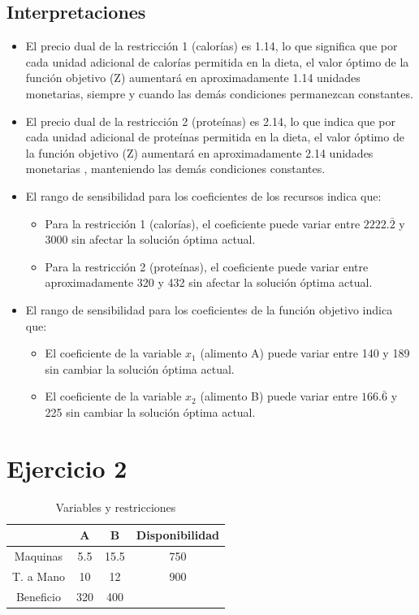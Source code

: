 \documentclass[12pt]{article}
\begin{document}
\subsection*{Interpretaciones}
\begin{itemize}
  \item El precio dual de la restricción 1 (calorías) es 1.14, lo que significa que por cada unidad adicional de 
  calorías permitida en la dieta, el valor óptimo de la función objetivo (Z) aumentará en aproximadamente 1.14 unidades 
  monetarias, siempre y cuando las demás condiciones permanezcan constantes.
  \item El precio dual de la restricción 2 (proteínas) es 2.14, lo que indica que por cada unidad adicional de proteínas 
  permitida en la dieta, el valor óptimo de la función objetivo (Z) aumentará en aproximadamente 2.14 unidades monetarias
  , manteniendo las demás condiciones constantes.
  \item El rango de sensibilidad para los coeficientes de los recursos indica que:
    \begin{itemize}
      \item Para la restricción 1 (calorías), el coeficiente puede variar entre \(2222.\bar{2}\) y 3000 sin afectar la solución óptima actual.
      \item Para la restricción 2 (proteínas), el coeficiente puede variar entre aproximadamente 320 y 432 sin afectar la solución óptima actual.
    \end{itemize}
  \item El rango de sensibilidad para los coeficientes de la función objetivo indica que:
    \begin{itemize}
      \item El coeficiente de la variable \(x_1\) (alimento A) puede variar entre 140 y 189 sin cambiar la solución óptima actual.
      \item El coeficiente de la variable \(x_2\) (alimento B) puede variar entre \(166.\bar{6}\) y 225 sin cambiar la solución óptima actual.
    \end{itemize}
\end{itemize}





\newpage
\section*{Ejercicio 2}

\begin{table}[h]
  \centering
  \begin{tabular}{|c|c|c|c|}
  \hline
            & A   & B  & Disponibilidad \\ \hline
  Maquinas  & 5.5 & 15.5 & 750   \\ \hline
  T. a Mano & 10   & 12  & 900     \\ \hline
  Beneficio & 320 & 400 & \\ \hline
  \end{tabular}
  \caption{Variables y restricciones}
  \label{tab:Ejercicio2}
\end{table}
\end{document}

